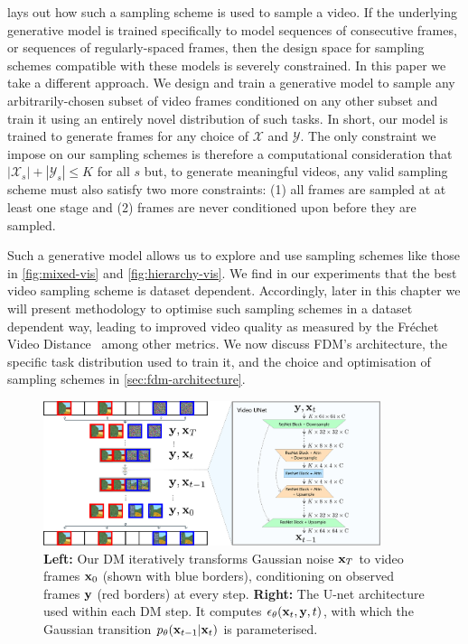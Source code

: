  lays out how such a sampling scheme is used to sample a video. If the underlying generative model is trained specifically to model sequences of consecutive frames, or sequences of regularly-spaced frames, then the design space for sampling schemes compatible with these models is severely constrained. In this paper we take a  different approach.  We design and train a generative model to sample any arbitrarily-chosen subset of video frames conditioned on any other subset and train it using an entirely novel distribution of such tasks. In short, our model is trained to generate frames for any choice of $\mathcal{X}$ and $\mathcal{Y}$. The only constraint we impose on our sampling schemes is therefore a computational consideration that $|\mathcal{X}_s| + |\mathcal{Y}_s| \leq K$ for all $s$ but, to generate meaningful videos, any valid sampling scheme must also satisfy two more constraints: (1) all frames are sampled at at least one stage and (2) frames are never conditioned upon before they are sampled.

Such a generative model allows us to explore and use sampling schemes like those in \cref{fig:mixed-vis} and \cref{fig:hierarchy-vis}.  We find in our experiments that the best video sampling scheme is dataset dependent. Accordingly, later in this chapter we will present methodology to optimise such sampling schemes in a dataset dependent way, leading to improved video quality as measured by the Fréchet Video Distance~\cite{unterthiner2018towards} among other metrics. We now discuss FDM's architecture, the specific task distribution  used to train it, and the choice and optimisation of sampling schemes in \cref{sec:fdm-architecture}.

\begin{figure}[t]
    \centering
    \includegraphics[width=0.88\textwidth]{figs/fdm/video-architecture-v8.pdf}
    \caption{\textbf{Left:} Our DM iteratively transforms Gaussian noise ${\mathbf{x}}_T$ to video frames ${\mathbf{x}}_0$ (shown with blue borders), conditioning on observed frames ${\mathbf{y}}$ (red borders) at every step. \textbf{Right:} The U-net architecture used within each DM step. It computes $\epsilon_\theta({\mathbf{x}}_t, {\mathbf{y}}, t)$, with which the Gaussian transition $p_\theta({\mathbf{x}}_{t-1}|{\mathbf{x}}_t)$ is parameterised.
    }
    \label{fig:architecture}
\end{figure}

